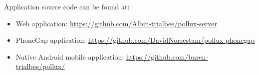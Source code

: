 Application source code can be found at:
\begin{itemize}
  \item Web application: \url{https://github.com/Albin-trialbee/pollux-server}
  \item PhoneGap application: \url{https://github.com/DavidNorrestam/pollux-phonegap}
  \item Native Android mobile application: \url{https://github.com/buren-trialbee/pollux/}
\end{itemize}